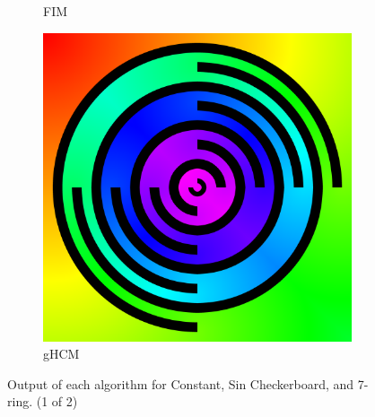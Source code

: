 \documentclass[11pt]{article}       %
\begin{document}
\begin{figure}
\begin{subfigure}[b]{.3\columnwidth}
		\caption{FIM}
	\end{subfigure}
	\begin{subfigure}[b]{.3\columnwidth}
		\includegraphics[width=\textwidth]{Figures/ghcm_systolic_7_rings}
		\caption{gHCM}
	\end{subfigure}
	
	\caption{Output of each algorithm for Constant, Sin Checkerboard, and 7-ring. (1 of 2)}
	\label{fig:output_1}
\end{figure}
\end{document}
